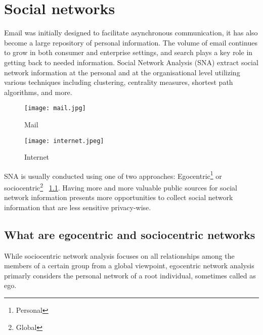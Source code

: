 \documentclass[10pt,twoside,slovak,a4paper]{article}
\begin{document}
\section{Social networks} \label{web vs email}
Email was initially designed to facilitate asynchronous communication, it has also become a large repository of personal information. The volume of email continues to grow in both consumer and enterprise settings, and search plays a key role in getting back to needed information. Social Network Analysis (SNA) extract social network information at the personal and at the organisational level utilizing various techniques including clustering, centrality measures, shortest path algorithms, and more.

\begin{figure*}[h!]
	\centering
	\begin{subfigure}[b]{0.3\linewidth}
		\texttt{[image: mail.jpg]}
		\caption{Mail}
	\end{subfigure}
	\space                                                
	\begin{subfigure}[b]{0.3\linewidth}
		\texttt{[image: internet.jpeg]}
		\caption{Internet}
	\end{subfigure}
	\label{fig:web}

\end{figure*}
SNA is usually conducted using one of two approaches: Egocentric\footnote{Personal} or sociocentric\footnote{Global} ~\ref{vysvetlenie}.  Having more and more valuable public sources for social network information presents more opportunities to collect social network information that are less sensitive privacy-wise. 




\subsection{What are egocentric and sociocentric networks} \label{vysvetlenie}
While sociocentric network analysis focuses on all relationships among the members of a certain group from a global viewpoint, egocentric network analysis primarly considers the personal network of a root individual, sometimes called as ego. 
\end{document}
